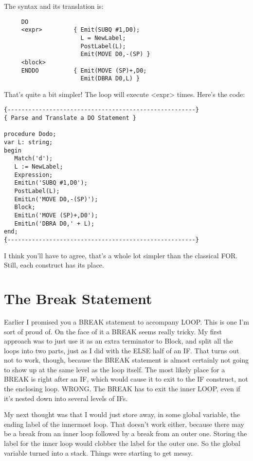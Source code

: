 The syntax and its translation is:

\begin{verbatim}
     DO
     <expr>         { Emit(SUBQ #1,D0);
                      L = NewLabel;
                      PostLabel(L);
                      Emit(MOVE D0,-(SP) }
     <block>
     ENDDO          { Emit(MOVE (SP)+,D0;
                      Emit(DBRA D0,L) }
\end{verbatim}

That's quite a bit simpler!  The loop will execute  <expr> times. Here's the code:

\begin{verbatim}
{------------------------------------------------------}
{ Parse and Translate a DO Statement }

procedure Dodo;
var L: string;
begin
   Match('d');
   L := NewLabel;
   Expression;
   EmitLn('SUBQ #1,D0');
   PostLabel(L);
   EmitLn('MOVE D0,-(SP)');
   Block;
   EmitLn('MOVE (SP)+,D0');
   EmitLn('DBRA D0,' + L);
end;
{------------------------------------------------------}
\end{verbatim}

I think you'll have to agree, that's a whole lot simpler than the classical FOR. Still, each construct has its place.

\section{The Break Statement}

Earlier I promised you a BREAK statement to accompany LOOP. This is  one  I'm sort of proud of. On the face of it a  BREAK  seems really  tricky. My first approach was to just use it as an extra terminator to Block, and split all the loops into two parts, just as  I did with the ELSE half of an IF. That  turns  out  not  to work, though, because the BREAK statement is almost certainly not going to show  up at the same level as the loop itself. The most likely place for a BREAK is right after an IF, which  would cause it to exit to the IF  construct, not the enclosing loop. WRONG. The  BREAK  has  to exit the inner LOOP, even if it's nested down into several levels of IFs.

My next thought was that I would just store away, in  some global variable, the ending label of the innermost loop. That doesn't work  either, because there may be a break  from  an  inner  loop followed by a break from an outer one. Storing the label for the inner loop would clobber the label for the  outer  one. So the global variable turned into a stack. Things were starting to get messy.

